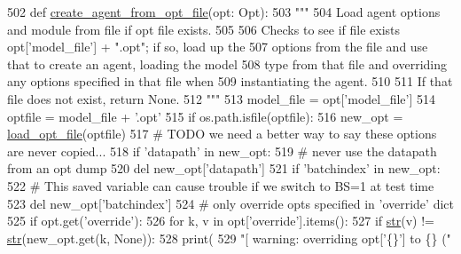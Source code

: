 \begin{DoxyCode}
502 \textcolor{keyword}{def }\hyperlink{namespaceparlai_1_1core_1_1agents_a8dcf9aa8caf8fe1046ff4cac7f38b54c}{create\_agent\_from\_opt\_file}(opt: Opt):
503     \textcolor{stringliteral}{"""}
504 \textcolor{stringliteral}{    Load agent options and module from file if opt file exists.}
505 \textcolor{stringliteral}{}
506 \textcolor{stringliteral}{    Checks to see if file exists opt['model\_file'] + ".opt"; if so, load up the}
507 \textcolor{stringliteral}{    options from the file and use that to create an agent, loading the model}
508 \textcolor{stringliteral}{    type from that file and overriding any options specified in that file when}
509 \textcolor{stringliteral}{    instantiating the agent.}
510 \textcolor{stringliteral}{}
511 \textcolor{stringliteral}{    If that file does not exist, return None.}
512 \textcolor{stringliteral}{    """}
513     model\_file = opt[\textcolor{stringliteral}{'model\_file'}]
514     optfile = model\_file + \textcolor{stringliteral}{'.opt'}
515     \textcolor{keywordflow}{if} os.path.isfile(optfile):
516         new\_opt = \hyperlink{namespaceparlai_1_1core_1_1opt_a37f4d5498e9174737b7dab37a786c04f}{load\_opt\_file}(optfile)
517         \textcolor{comment}{# TODO we need a better way to say these options are never copied...}
518         \textcolor{keywordflow}{if} \textcolor{stringliteral}{'datapath'} \textcolor{keywordflow}{in} new\_opt:
519             \textcolor{comment}{# never use the datapath from an opt dump}
520             del new\_opt[\textcolor{stringliteral}{'datapath'}]
521         \textcolor{keywordflow}{if} \textcolor{stringliteral}{'batchindex'} \textcolor{keywordflow}{in} new\_opt:
522             \textcolor{comment}{# This saved variable can cause trouble if we switch to BS=1 at test time}
523             del new\_opt[\textcolor{stringliteral}{'batchindex'}]
524         \textcolor{comment}{# only override opts specified in 'override' dict}
525         \textcolor{keywordflow}{if} opt.get(\textcolor{stringliteral}{'override'}):
526             \textcolor{keywordflow}{for} k, v \textcolor{keywordflow}{in} opt[\textcolor{stringliteral}{'override'}].items():
527                 \textcolor{keywordflow}{if} \hyperlink{namespacegenerate__task__READMEs_a5b88452ffb87b78c8c85ececebafc09f}{str}(v) != \hyperlink{namespacegenerate__task__READMEs_a5b88452ffb87b78c8c85ececebafc09f}{str}(new\_opt.get(k, \textcolor{keywordtype}{None})):
528                     print(
529                         \textcolor{stringliteral}{"[ warning: overriding opt['\{\}'] to \{\} ("}

\end{DoxyCode}
